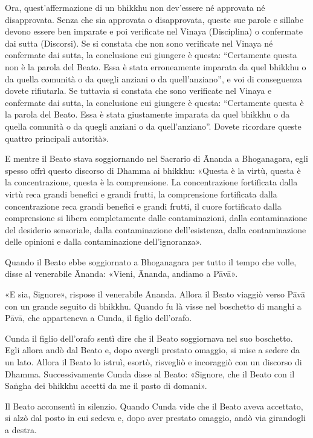 Ora, quest’affermazione di un bhikkhu non dev’essere né approvata né
disapprovata. Senza che sia approvata o disapprovata, queste sue parole e
sillabe devono essere ben imparate e poi verificate nel Vinaya (Disciplina) o
confermate dai sutta (Discorsi). Se si constata che non sono verificate nel
Vinaya né confermate dai sutta, la conclusione cui giungere è questa:
“Certamente questa non è la parola del Beato. Essa è stata erroneamente imparata
da quel bhikkhu o da quella comunità o da quegli anziani o da quell’anziano”, e
voi di conseguenza dovete rifiutarla. Se tuttavia si constata che sono
verificate nel Vinaya e confermate dai sutta, la conclusione cui giungere è
questa: “Certamente questa è la parola del Beato. Essa è stata giustamente
imparata da quel bhikkhu o da quella comunità o da quegli anziani o da
quell’anziano”. Dovete ricordare queste quattro principali autorità».


E mentre il Beato stava soggiornando nel Sacrario di Ānanda a Bhoganagara, egli
spesso offrì questo discorso di Dhamma ai bhikkhu: «Questa è la virtù, questa è
la concentrazione, questa è la comprensione. La concentrazione fortificata dalla
virtù reca grandi benefici e grandi frutti, la comprensione fortificata dalla
concentrazione reca grandi benefici e grandi frutti, il cuore fortificato dalla
comprensione si libera completamente dalle contaminazioni, dalla contaminazione
del desiderio sensoriale, dalla contaminazione dell’esistenza, dalla
contaminazione delle opinioni e dalla contaminazione dell’ignoranza».


Quando il Beato ebbe soggiornato a Bhoganagara per tutto il tempo che volle,
disse al venerabile Ānanda: «Vieni, Ānanda, andiamo a Pāvā».

«E sia, Signore», rispose il venerabile Ānanda. Allora il Beato viaggiò verso
Pāvā con un grande seguito di bhikkhu. Quando fu là visse nel boschetto di
manghi a Pāvā, che apparteneva a Cunda, il figlio dell’orafo.

Cunda il figlio dell’orafo sentì dire che il Beato soggiornava nel suo
boschetto. Egli allora andò dal Beato e, dopo avergli prestato omaggio, si mise
a sedere da un lato. Allora il Beato lo istruì, esortò, risvegliò e incoraggiò
con un discorso di Dhamma. Successivamente Cunda disse al Beato: «Signore, che
il Beato con il Saṅgha dei bhikkhu accetti da me il pasto di domani».

Il Beato acconsentì in silenzio. Quando Cunda vide che il Beato aveva accettato,
si alzò dal posto in cui sedeva e, dopo aver prestato omaggio, andò via
girandogli a destra.

